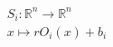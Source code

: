 \documentclass[preview]{standalone}
\begin{document}
\begin{align*}
S_i : \mathbb{R}^n \to \mathbb{R}^n \\    x \mapsto r O_i(x) + b_i
\end{align*}
\end{document}

